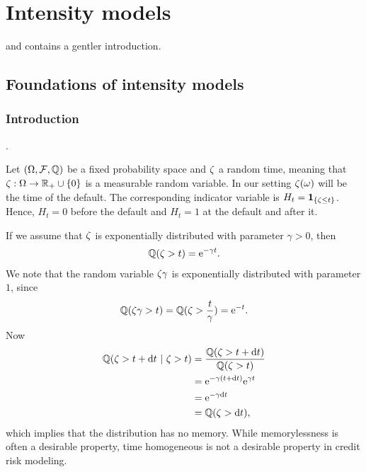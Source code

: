 \chapter{Intensity models}
\label{chap:intensity}

 \textcite{bieleckirutkowski2002credit} and \textcite{brigo2007interest} contains a gentler introduction.

\section{Foundations of intensity models}

\subsection{Introduction}

 \textcite[pp. 759--764]{brigo2007interest}.

Let $(\Omega, \mathcal{F}, \mathbb{Q})$ be a fixed probability space and $\zeta$ a random time, meaning that $\zeta : \Omega \rightarrow \mathbb{R}_+ \cup \{ 0 \}$ is a measurable random variable. In our setting $\zeta( \omega )$ will be the time of the default. The corresponding indicator variable is $H_t = \boldsymbol{1}_{ \{\zeta \leq t \} }$. Hence, $H_t=0$ before the default and $H_t = 1$ at the default and after it.

If we assume that $\zeta$ is exponentially distributed with parameter $\gamma > 0$, then
  \begin{align}
    \label{exponential-cumulative-inverse}
    \mathbb{Q}( \zeta > t ) = \mathrm{e}^{- \gamma t } .
  \end{align} 
We note that the random variable $\zeta \gamma$ is exponentially distributed with parameter $1$, since
  \begin{align}
    \label{exponentiallywithparameter1}
    \mathbb{Q}( \zeta \gamma > t ) = \mathbb{Q}( \zeta > \frac{t}{\gamma} ) = \mathrm{e}^{-t} .
  \end{align}
Now 
  \begin{align}
    \mathbb{Q}( \zeta > t + \mathrm{d} t \ | \ \zeta > t ) & = \frac{ \mathbb{Q}( \zeta > t + \mathrm{d} t ) }{ \mathbb{Q}( \zeta > t ) } \\ &= \mathrm{e}^{ - \gamma ( t + \mathrm{d} t ) } \mathrm{e}^{ \gamma t } \\
    & =  \mathrm{e}^{ - \gamma \mathrm{d} t } \\
    &= \mathbb{Q}( \zeta > \mathrm{d} t ) ,
  \end{align}
which implies that the distribution has no memory. While memorylessness is often a desirable property, time homogeneous is not a desirable property in credit risk modeling. 

